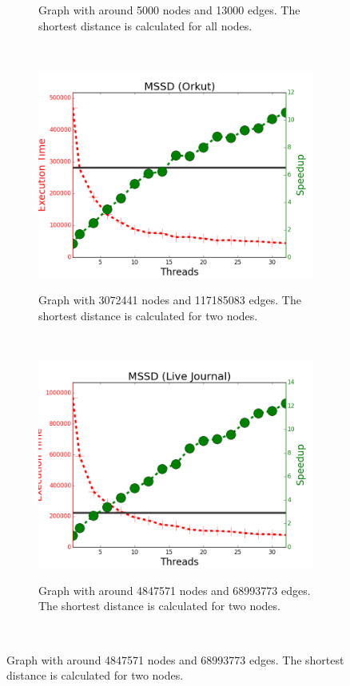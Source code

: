 \begin{figure}[]
\begin{subfigure}[b]{\plotsize\textwidth}
                \label{fig:implementation:scale_sssp_uspowergrid}
                \caption{Graph with around 5000 nodes and 13000 edges. The
                shortest distance is calculated for all nodes.}
        \end{subfigure}\\
        \begin{subfigure}[b]{\plotsize\textwidth}
                \includegraphics[width=\textwidth]{experiments/scalability/scale-shortest-orkut.png}
                \label{fig:implementation:scale_sssp_orkut}
                \caption{Graph with 3072441 nodes and 117185083 edges. The shortest
                   distance is calculated for two nodes.}
        \end{subfigure}
        ~
        \begin{subfigure}[b]{\plotsize\textwidth}
                \includegraphics[width=\textwidth]{experiments/scalability/scale-shortest-livejournal.png}
                \label{fig:implementation:scale_sssp_livejournal}
                \caption{Graph with around 4847571 nodes and 68993773 edges. The
                shortest distance is calculated for two nodes.}
        \end{subfigure}\\


\end{figure}
